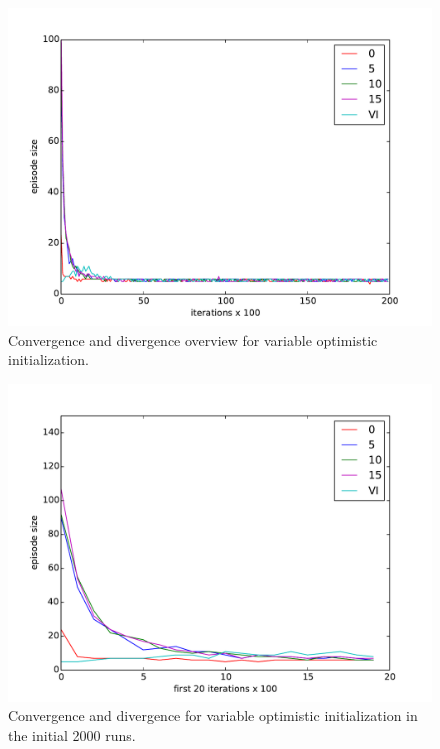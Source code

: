 \documentclass[paper=a4, fontsize=11pt]{scrartcl}
\numberwithin{equation}{section}		%
\numberwithin{figure}{section}			%
\numberwithin{table}{section}				%
\begin{document}
\begin{figure}[H] \centering
\includegraphics[scale=0.5]{optiInitOverview.pdf}
\caption{Convergence and divergence overview for variable optimistic initialization.} 
\label{figure:optimisticOverview}
\end{figure}
\begin{figure}[H] \centering
\includegraphics[scale=0.5]{optiInitfirst20x100.pdf}
\caption{Convergence and divergence for variable optimistic initialization in the initial 2000 runs.} 
\label{figure:optimisticfirst20}
\end{figure}
\end{document}
